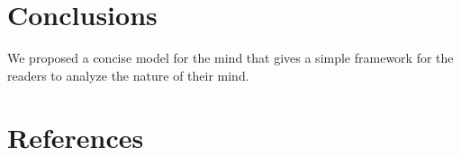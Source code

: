 \documentclass[reprint,amsmath,amssymb,apr,aip,onecolumn, 11pt]{revtex4-1}
\begin{document}
	\section{Conclusions}
	We proposed a concise model for the mind that gives a simple framework for the readers to analyze the nature of their mind.  
	
	
	
	
	\section*{References}
	
	
	
	
	
		
	\clearpage
	
	
\end{document}
